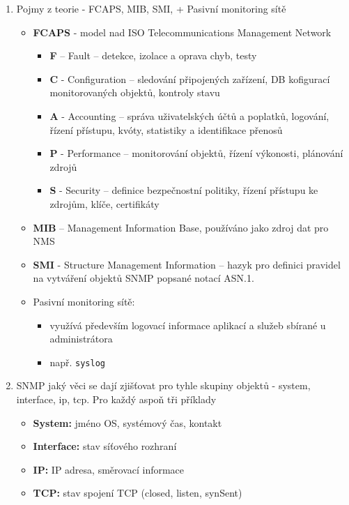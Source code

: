 \documentclass[12pt,a4paper,titlepage,final]{article}
\begin{document}
\begin{enumerate}
	\item Pojmy z teorie - FCAPS, MIB, SMI, + Pasivní monitoring sítě
	\begin{itemize}
		\item \textbf{FCAPS} - model nad ISO Telecommunications Management Network
		\begin{itemize}
			\item \textbf{F} -- Fault -- detekce, izolace a oprava chyb, testy
			\item \textbf{C} - Configuration -- sledování připojených zařízení, DB kofigurací monitorovaných objektů, kontroly stavu
			\item \textbf{A} - Accounting -- správa uživatelských účtů a poplatků, logování, řízení přístupu, kvóty, statistiky a identifikace přenosů
			\item \textbf{P} - Performance -- monitorování objektů, řízení výkonosti, plánování zdrojů
			\item \textbf{S} - Security -- definice bezpečnostní politiky, řízení přístupu ke zdrojům, klíče, certifikáty
		\end{itemize} 	
		\item \textbf{MIB} -- Management Information Base, používáno jako zdroj dat pro NMS
		\item \textbf{SMI} - Structure Management Information -- hazyk pro definici pravidel na vytváření objektů SNMP popsané notací ASN.1.
		
		\item Pasivní monitoring sítě:
		\begin{itemize}
			\item využívá především logovací informace aplikací a služeb sbírané u administrátora
			\item např. \texttt{syslog} 	
		\end{itemize}
	\end{itemize}

	\item SNMP jaký věci se dají zjišťovat pro tyhle skupiny objektů - system, interface, ip, tcp. Pro každý aspoň tři příklady
	\begin{itemize}
		\item \textbf{System:} jméno OS, systémový čas, kontakt
		\item \textbf{Interface:} stav síťového rozhraní
		\item \textbf{IP:} IP adresa, směrovací informace
		\item \textbf{TCP:} stav spojení TCP (closed, listen, synSent) 
	\end{itemize}


\end{enumerate}
\end{document}
